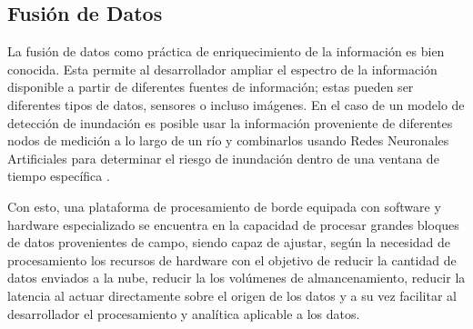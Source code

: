 \subsection{Fusión de Datos}

La fusión de datos como práctica de enriquecimiento de la información es bien conocida. Esta permite al desarrollador ampliar el espectro de la información disponible a partir de diferentes fuentes de información; estas pueden ser diferentes tipos de datos, sensores o incluso imágenes. En el caso de un modelo de detección de inundación es posible usar la información proveniente de diferentes nodos de medición a lo largo de un río y combinarlos usando Redes Neuronales Artificiales para determinar el riesgo de inundación dentro de una ventana de tiempo específica \cite{ANN1,ANN2,ANN3}.

Con esto, una plataforma de procesamiento de borde equipada con software y hardware especializado \iffalse como el propuesto en este proyecto \fi se encuentra en la capacidad de procesar grandes bloques de datos provenientes de campo, siendo capaz de ajustar, según la necesidad de procesamiento los recursos de hardware con el objetivo de reducir la cantidad de datos enviados a la nube, reducir la los volúmenes de almancenamiento, reducir la latencia al actuar directamente sobre el origen de los datos y a su vez facilitar al desarrollador el procesamiento y analítica aplicable a los datos.